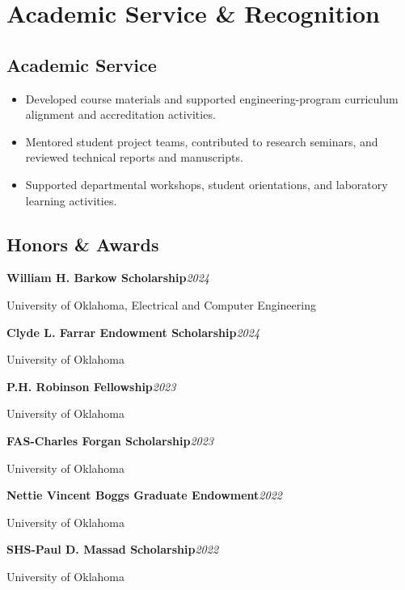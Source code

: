 \documentclass[10pt,letterpaper]{extarticle}
\newcommand{\entry}[2]{\Needspace{4\baselineskip}\textbf{#1}\hfill\textit{#2}\par}
\begin{document}
\section{Academic Service \& Recognition}
\subsection{Academic Service}
\begin{itemize}
\item Developed course materials and supported engineering-program curriculum alignment and accreditation activities.
\item Mentored student project teams, contributed to research seminars, and reviewed technical reports and manuscripts.
\item Supported departmental workshops, student orientations, and laboratory learning activities.
\end{itemize}
\subsection{Honors \& Awards}
\entry{William H. Barkow Scholarship}{2024}
{\small University of Oklahoma, Electrical and Computer Engineering\par}
\entry{Clyde L. Farrar Endowment Scholarship}{2024}
{\small University of Oklahoma\par}
\entry{P.H. Robinson Fellowship}{2023}
{\small University of Oklahoma\par}
\entry{FAS-Charles Forgan Scholarship}{2023}
{\small University of Oklahoma\par}
\entry{Nettie Vincent Boggs Graduate Endowment}{2022}
{\small University of Oklahoma\par}
\entry{SHS-Paul D. Massad Scholarship}{2022}
{\small University of Oklahoma\par}
\end{document}

